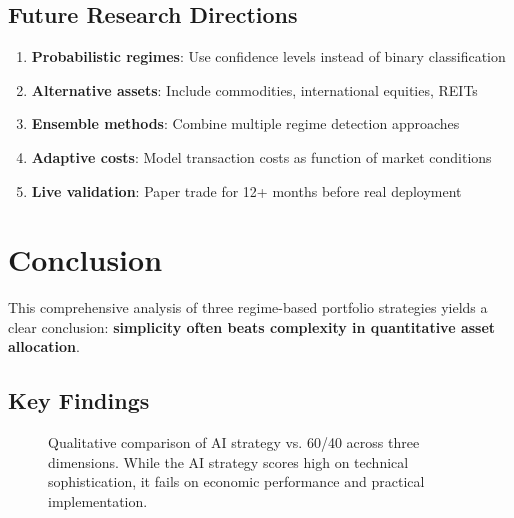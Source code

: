 \documentclass[twocolumn,ieee]{arithmaxresearch}
\begin{document}
\subsection{Future Research Directions}

\begin{enumerate}
    \item \textbf{Probabilistic regimes}: Use confidence levels instead of binary classification
    \item \textbf{Alternative assets}: Include commodities, international equities, REITs
    \item \textbf{Ensemble methods}: Combine multiple regime detection approaches
    \item \textbf{Adaptive costs}: Model transaction costs as function of market conditions
    \item \textbf{Live validation}: Paper trade for 12+ months before real deployment
\end{enumerate}

\section{Conclusion}

This comprehensive analysis of three regime-based portfolio strategies yields a clear conclusion: \textbf{simplicity often beats complexity in quantitative asset allocation}.

\subsection{Key Findings}

\begin{figure}[h]
\centering
{}
\caption{Qualitative comparison of AI strategy vs. 60/40 across three dimensions. While the AI strategy scores high on technical sophistication, it fails on economic performance and practical implementation.}
\label{fig:qualitative}
\end{figure}
\end{document}
